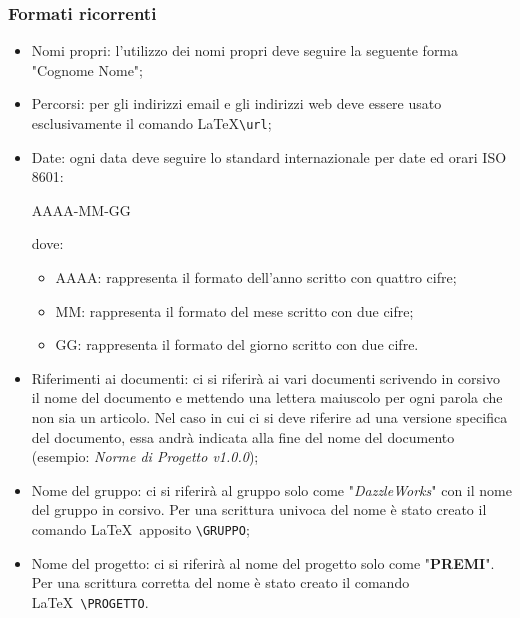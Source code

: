 \subsubsection{Formati ricorrenti}
\begin{itemize}
	\item Nomi propri: l'utilizzo dei nomi propri deve seguire la seguente forma "Cognome Nome";
	\item Percorsi: per gli indirizzi email e gli indirizzi web deve essere usato esclusivamente il comando \LaTeX  \verb|\url|;
	\item Date:  ogni data deve seguire lo standard internazionale per date ed orari ISO 8601:
	\begin{center}
		AAAA-MM-GG
	\end{center}
	dove:
	\begin{itemize}
		\item AAAA: rappresenta il formato dell'anno scritto con quattro cifre;
		\item MM: rappresenta il formato del mese scritto con due cifre;
		\item GG: rappresenta il formato del giorno scritto con due cifre.
	\end{itemize}
	\item Riferimenti ai documenti: ci si riferirà ai vari documenti scrivendo in corsivo il nome del documento e mettendo una lettera maiuscolo per ogni parola che non sia un articolo. Nel caso in cui ci si deve riferire ad una versione specifica del documento, essa andrà indicata alla fine  del nome del documento (esempio: \textit{Norme di Progetto v1.0.0});
	\item Nome del gruppo: ci si riferirà al gruppo solo come "\textit{DazzleWorks}" con il nome del gruppo in corsivo. Per una scrittura univoca del nome è stato creato il comando \LaTeX\ apposito \verb|\GRUPPO|;
	\item Nome del progetto: ci si riferirà al nome del progetto solo come "\textbf{PREMI}". Per una scrittura corretta del nome è stato creato il comando \LaTeX\ \verb|\PROGETTO|.
\end{itemize}

